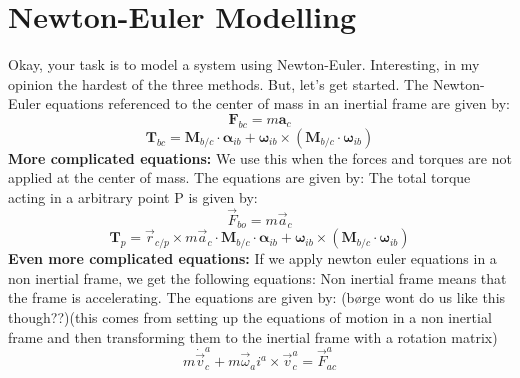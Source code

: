 \section{Newton-Euler Modelling}
Okay, your task is to model a system using Newton-Euler. Interesting, in my opinion the hardest of the three methods. But, let's get started.\newline
The Newton-Euler equations referenced to the center of mass in an inertial frame are given by:
\begin{equation}
    \mathbf{F}_{bc} = m \mathbf{a}_c
\end{equation}
\begin{equation}
    \mathbf{T}_{bc} = \mathbf{M}_{b/c} \cdot \boldsymbol{\alpha}_{ib} + \boldsymbol{\omega}_{ib} \times \left( \mathbf{M}_{b/c} \cdot \boldsymbol{\omega}_{ib} \right)
\end{equation}
\textbf{More complicated equations: } \newline
We use this when the forces and torques are not applied at the center of mass. The equations are given by:
The total torque acting in a arbitrary point P is given by:
\begin{equation}
    \vec{F}_{bo} = m \vec{a}_c
\end{equation}
\begin{equation}
    \mathbf{T}_{p} = \vec{r}_{c/p} \times m \vec{a}_c \cdot \mathbf{M}_{b/c} \cdot \boldsymbol{\alpha}_{ib} + \boldsymbol{\omega}_{ib} \times \left( \mathbf{M}_{b/c} \cdot \boldsymbol{\omega}_{ib} \right)
\end{equation}   
\textbf{Even more complicated equations: } \newline
If we apply newton euler equations in a non inertial frame, we get the following equations:
Non inertial frame means that the frame is accelerating. The equations are given by:
(børge wont do us like this though??)(this comes from setting up the equations of motion in a non inertial frame and then transforming them to the inertial frame with a rotation matrix)
\begin{equation}
    m \dot{\vec{v}}_c^a + m \vec{\omega}_ai^a \times \vec{v}_c^a = \vec{F}_{ac}^{a}
\end{equation}